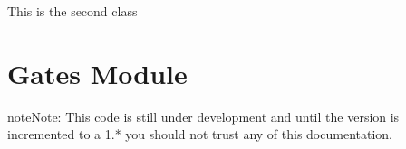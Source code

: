 \documentclass[letterpaper,10pt,english]{sphinxmanual}
\begin{document}

\begin{fulllineitems}
\label{\detokenize{index:example.Example2}}
\pysigstartsignatures
{}
\pysigstopsignatures
\sphinxAtStartPar
This is the second class

\end{fulllineitems}


\chapter{Gates Module}
\label{\detokenize{index:gates-module}}\label{\detokenize{index:module-gates}}
\begin{sphinxadmonition}{note}{Note:}
\sphinxAtStartPar
This code is still under development and until the version
is incremented to a 1.* you should not trust any of this
documentation.
\end{sphinxadmonition}
\end{document}
